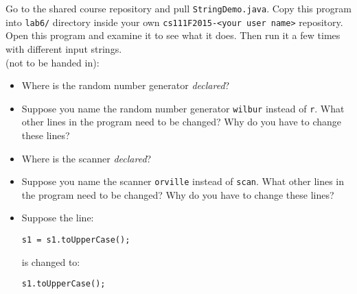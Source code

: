 Go to the shared course repository and pull {\tt StringDemo.java}. Copy this program into {\tt lab6/} directory inside
your own {\tt cs111F2015-<your user name>} repository.  Open this program and examine it to see what it does. Then run
it a few times with different input strings.\\

(not to be handed in):
\begin{itemize}
\item Where is the random number generator {\em declared}?
\item Suppose you name the random number generator {\tt wilbur} instead of {\tt r}.
What other lines in the program need to be changed? Why do you have to change these lines?
\item Where is the scanner {\em declared}?
\item Suppose you name the scanner {\tt orville} instead of {\tt scan}.
What other lines in the program need to be changed? Why do you have to change these lines?
\item
Suppose the line:

\vspace*{-.2in}
\begin{center}
\verb$s1 = s1.toUpperCase();$
\end{center}
\vspace*{-.2in}

is changed to:

\vspace*{-.2in}
\begin{center}
\verb$s1.toUpperCase();$
\end{center}


\end{itemize}
